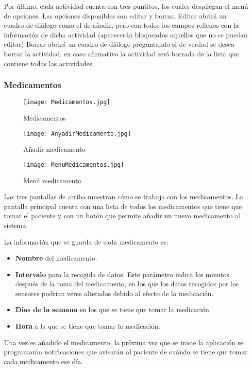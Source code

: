 \documentclass[11pt,spanish]{article}
\begin{document}
Por último, cada actividad cuenta con tres puntitos, los cuales despliegan el menú de opciones. Las opciones disponibles son editar y borrar. Editar abrirá un cuadro de diálogo como el de añadir, pero con todos los campos rellenos con la información de dicha actividad (aparecerán bloqueados aquellos que no se puedan editar) Borrar abrirá un cuadro de diálogo preguntando si de verdad se desea borrar la actividad, en caso afirmativo la actividad será borrada de la lista que contiene todas las actividades.

\subsubsection{Medicamentos}
\begin{figure}[!htb]
  \texttt{[image: Medicamentos.jpg]}
  \caption{Medicamentos}
\endminipage\hfill
{}
  \texttt{[image: AnyadirMedicamento.jpg]}
  \caption{Añadir medicamento}
\endminipage\hfill
{}%
  \texttt{[image: MenuMedicamentos.jpg]}
  \caption{Menú medicamento}
\endminipage
\end{figure}

Las tres pantallas de arriba muestran cómo se trabaja con los medicamentos. La pantalla principal cuenta con una lista de todos los medicamentos que tiene que tomar el paciente y con un botón que permite añadir un nuevo medicamento al sistema.
\newline

La información que se guarda de cada medicamento es:

\begin{itemize}
	\item {\bf Nombre} del medicamento.
	\item {\bf Intervalo} para la recogida de datos. Este parámetro indica los minutos después de la toma del medicamento, en los que los datos recogidos por los sensores podrían verse alterados debido al efecto de la medicación.
	\item {\bf Días de la semana} en los que se tiene que tomar la medicación.
	\item {\bf Hora} a la que se tiene que tomar la medicación.
\end{itemize}

Una vez es añadido el medicamento, la próxima vez que se inicie la aplicación se programarán notificaciones que avisarán al paciente de cuándo se tiene que tomar cada medicamento ese día.
\newline
\end{document}

